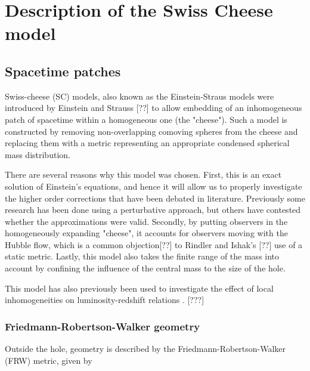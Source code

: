\chapter{Description of the Swiss Cheese model}

\section{Spacetime patches}

Swiss-cheese (SC) models, also known as the Einstein-Straus models were introduced by Einstein and Strauss [??] to allow embedding of an inhomogeneous patch of spacetime within a homogeneous one (the "cheese"). Such a model is constructed by removing non-overlapping comoving spheres from the cheese and replacing them with a metric representing an appropriate condensed spherical mass distribution. 

There are several reasons why this model was chosen. First, this is an exact solution of Einstein's equations, and hence it will allow us to properly investigate the higher order corrections that have been debated in literature. Previously some research \citep{simpson2010lensing} has been done using a perturbative approach, but others \citep{ishak2010more} have contested whether the approximations were valid. Secondly, by putting observers in the homogeneously expanding "cheese", it accounts for observers moving with the Hubble flow, which is a common objection[??] to Rindler and Ishak's [??] use of a static metric. Lastly, this model also takes the finite range of the mass into account by confining the influence of the central mass to the size of the hole. 

This model has also previously been used to investigate the effect of local inhomogeneities on luminosity-redshift relations \citep{fleury2013interpretation}. [???]





\subsection{Friedmann-Robertson-Walker geometry}
Outside the hole, geometry is described by the Friedmann-Robertson-Walker (FRW) metric, given by

